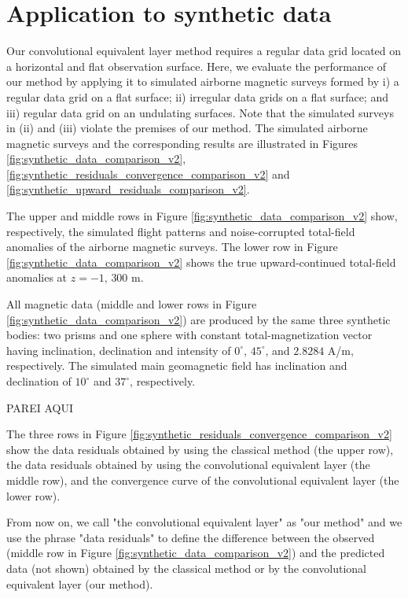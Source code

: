 \section{Application to synthetic data}

Our convolutional equivalent layer method requires a regular data grid located on a 
horizontal and flat observation surface.
Here, we evaluate the performance of our method by applying it to simulated airborne magnetic 
surveys formed by
i) a regular data grid on a flat surface;
ii) irregular data grids on a flat surface; and 
iii) regular data grid on an undulating surfaces.
Note that the simulated surveys in (ii) and (iii) violate the premises of our method. 
The simulated airborne magnetic surveys and the corresponding results 
are illustrated in Figures \ref{fig:synthetic_data_comparison_v2}, 
\ref{fig:synthetic_residuals_convergence_comparison_v2} and 
\ref{fig:synthetic_upward_residuals_comparison_v2}.

The upper and middle rows in Figure \ref{fig:synthetic_data_comparison_v2} show, respectively, 
the simulated flight patterns and noise-corrupted total-field anomalies of the airborne magnetic 
surveys. The lower row in Figure \ref{fig:synthetic_data_comparison_v2} shows the true 
upward-continued total-field anomalies at $z = -1, \, 300$ m.

All magnetic data (middle and lower rows in Figure \ref{fig:synthetic_data_comparison_v2}) 
are produced by the same three synthetic bodies: two prisms and one sphere with 
constant total-magnetization vector having inclination, declination and intensity of 
$0^{\circ}$, $45^{\circ}$, and $2.8284$ A/m, respectively. 
The simulated main geomagnetic field has inclination and declination of $10^{\circ}$ and $37^{\circ}$,
respectively. 

PAREI AQUI

The  three rows in Figure \ref{fig:synthetic_residuals_convergence_comparison_v2}  show the data residuals 
obtained by using the classical method (the upper row), the data residuals obtained by using the
convolutional equivalent layer (the middle row), and the convergence curve of the convolutional equivalent layer (the lower row).

From now on, we call "the convolutional equivalent layer" as "our method" and we use the phrase "data residuals" to define the difference between the observed (middle row in Figure \ref{fig:synthetic_data_comparison_v2}) and the predicted data (not shown) obtained by the classical method or by the convolutional equivalent layer (our method). 

